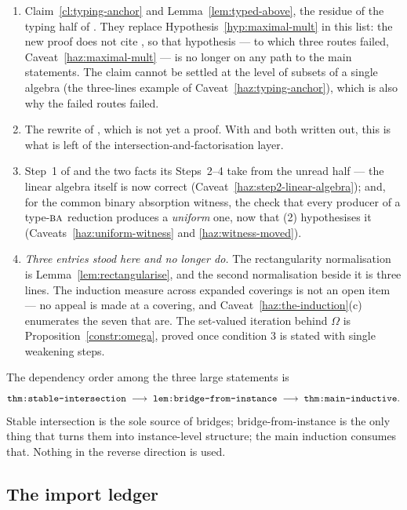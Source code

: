 \begin{enumerate}\tightlist
\item Claim~\ref{cl:typing-anchor} and Lemma~\ref{lem:typed-above}, the
  residue of the typing half of . They
  replace Hypothesis~\ref{hyp:maximal-mult} in this list: the new proof does
  not cite , so that hypothesis --- to which three
  routes failed, Caveat~\ref{haz:maximal-mult} --- is no longer on any path
  to the main statements. The claim cannot be settled at the level of
  subsets of a single algebra (the three-lines example of
  Caveat~\ref{haz:typing-anchor}), which is also why the failed routes
  failed.
\item The rewrite of , which is not yet a
  proof. With  and
   both written out, this is what is left
  of the intersection-and-factorisation layer.
\item Step~1 of  and the two facts its Steps~2--4 take
  from the unread half --- the linear algebra itself is now correct
  (Caveat~\ref{haz:step2-linear-algebra}); and, for the common binary
  absorption witness, the check that every producer of a type-$\textup{\textsc{ba}}$ reduction
  produces a \emph{uniform} one, now that (2)
  hypothesises it (Caveats~\ref{haz:uniform-witness} and
  \ref{haz:witness-moved}).
\item[] \emph{Three entries stood here and no longer do.} The rectangularity
  normalisation is Lemma~\ref{lem:rectangularise}, and the second normalisation
  beside it is three lines. The induction measure
  across expanded coverings is not an open item --- no appeal is made at a
  covering, and Caveat~\ref{haz:the-induction}(c) enumerates the seven that
  are. The set-valued iteration behind $\Omega$ is
  Proposition~\ref{constr:omega}, proved once condition 3 is stated with
  single weakening steps.
\end{enumerate}

The dependency order among the three large statements is
\[
  \text{\texttt{thm:stable-intersection}}\;\longrightarrow\;
  \text{\texttt{lem:bridge-from-instance}}\;\longrightarrow\;
  \text{\texttt{thm:main-inductive}} .
\]
Stable intersection is the sole source of bridges; bridge-from-instance is the
only thing that turns them into instance-level structure; the main induction
consumes that. Nothing in the reverse direction is used.

\subsection{The import ledger}\label{sec:imports-ledger}

